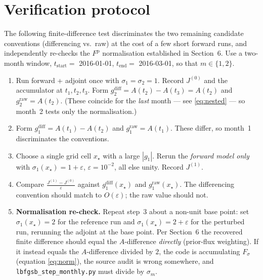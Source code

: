 \documentclass[12pt]{article}
\newcommand{\Fprior}{F^{\mathrm{p}}}
\newcommand{\tend}{t_{\mathrm{end}}}
\newcommand{\tstart}{t_{\mathrm{start}}}
\newcommand{\Adj}{A}
\begin{document}
\section{Verification protocol}
\label{sec:verify}

The following finite-difference test discriminates the two remaining candidate
conventions (differencing vs.\ raw) at the cost of a few short forward runs, and
independently re-checks the $\Fprior$ normalisation established in Section~6. Use a
two-month window, $\tstart = $ 2016-01-01, $\tend = $ 2016-03-01, so that
$m \in \{1,2\}$.

\begin{enumerate}
  \item Run forward + adjoint once with $\sigma_1 = \sigma_2 = 1$. Record $J^{(0)}$ and
        the accumulator at $t_1, t_2, t_3$. Form
        $g_2^{\mathrm{diff}} = \Adj(t_2) - \Adj(t_3) = \Adj(t_2)$ and
        $g_2^{\mathrm{raw}} = \Adj(t_2)$. (These coincide for the \emph{last} month ---
        see \eqref{eq:nested} --- so month~2 tests only the normalisation.)
  \item Form $g_1^{\mathrm{diff}} = \Adj(t_1) - \Adj(t_2)$ and
        $g_1^{\mathrm{raw}} = \Adj(t_1)$. These differ, so month~1 discriminates the
        conventions.
  \item Choose a single grid cell $x_\star$ with a large $|g_1|$. Rerun the
        \emph{forward model only} with $\sigma_1(x_\star) = 1 + \varepsilon$,
        $\varepsilon = 10^{-2}$, all else unity. Record $J^{(1)}$.
  \item Compare
        $\displaystyle \frac{J^{(1)} - J^{(0)}}{\varepsilon}$
        against $g_1^{\mathrm{diff}}(x_\star)$ and $g_1^{\mathrm{raw}}(x_\star)$.
        The differencing convention should match to $O(\varepsilon)$; the raw value
        should not.
  \item \textbf{Normalisation re-check.} Repeat step~3 about a non-unit base point: set
        $\sigma_1(x_\star) = 2$ for the reference run and $\sigma_1(x_\star) = 2+\varepsilon$
        for the perturbed run, rerunning the adjoint at the base point. Per Section~6 the
        recovered finite difference should equal the $\Adj$-difference \emph{directly}
        (prior-flux weighting). If it instead equals the $\Adj$-difference divided by $2$,
        the code is accumulating $F_\sigma$ (equation \eqref{eq:norm}), the source audit
        is wrong somewhere, and \texttt{lbfgsb\_step\_monthly.py} must divide by $\sigma_m$.
\end{enumerate}
\end{document}
